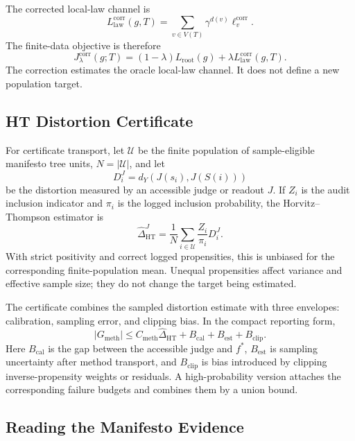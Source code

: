 The corrected local-law channel is
\[
  L_{\mathrm{law}}^{\mathrm{corr}}(g,T)
  =
  \sum_{v\in V(T)}\gamma^{d(v)}\ell_v^{\mathrm{corr}} .
\]
The finite-data objective is therefore
\begin{equation}
\label{eq:v8-corrected-objective}
  J_\lambda^{\mathrm{corr}}(g;T)
  =
  (1-\lambda)L_{\mathrm{root}}(g)
  +
  \lambda L_{\mathrm{law}}^{\mathrm{corr}}(g,T).
\end{equation}
The correction estimates the oracle local-law channel. It does not define a
new population target.

\subsection{HT Distortion Certificate}

For certificate transport, let \(\mathcal U\) be the finite population of
sample-eligible manifesto tree units, \(N=|\mathcal U|\), and let
\[
  D_i^J
  =
  d_Y\!\left(J(s_i),J(S(i))\right)
\]
be the distortion measured by an accessible judge or readout \(J\). If \(Z_i\)
is the audit inclusion indicator and \(\pi_i\) is the logged inclusion
probability, the Horvitz--Thompson estimator is
\begin{equation}
\label{eq:v8-ht-distortion}
  \widehat{\Delta}_{\mathrm{HT}}^{J}
  =
  \frac{1}{N}
  \sum_{i\in\mathcal U}
  \frac{Z_i}{\pi_i}D_i^J .
\end{equation}
With strict positivity and correct logged propensities, this is unbiased for
the corresponding finite-population mean. Unequal propensities affect variance
and effective sample size; they do not change the target being estimated.

The certificate combines the sampled distortion estimate with three envelopes:
calibration, sampling error, and clipping bias. In the compact reporting form,
\begin{equation}
\label{eq:v8-finite-sample-certificate}
  |G_{\mathrm{meth}}|
  \le
  C_{\mathrm{meth}}\widehat{\Delta}_{\mathrm{HT}}
  +
  B_{\mathrm{cal}}
  +
  B_{\mathrm{est}}
  +
  B_{\mathrm{clip}} .
\end{equation}
Here \(B_{\mathrm{cal}}\) is the gap between the accessible judge and
\(f^\ast\), \(B_{\mathrm{est}}\) is sampling uncertainty after method
transport, and \(B_{\mathrm{clip}}\) is bias introduced by clipping
inverse-propensity weights or residuals. A high-probability version attaches
the corresponding failure budgets and combines them by a union bound.

\subsection{Reading the Manifesto Evidence}

